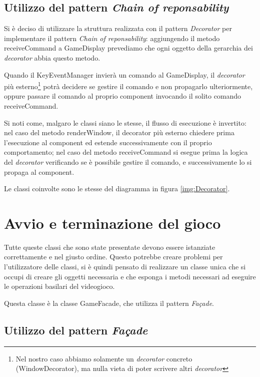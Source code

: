 \documentclass[a4paper,12pt]{article}
\begin{document}
\subsection{Utilizzo del pattern \emph{Chain of reponsability}}

Si \`e deciso di utilizzare la struttura realizzata con il pattern \emph{Decorator} per implementare il pattern \emph{Chain of reponsability}: aggiungendo il metodo \textsf{receiveCommand} a \textsf{GameDisplay} prevediamo che ogni oggetto della gerarchia dei \textit{decorator} abbia questo metodo.

Quando il \textsf{KeyEventManager} invier\`a un comando al \textsf{GameDisplay}, il \textit{decorator} pi\`u esterno\footnote{Nel nostro caso abbiamo solamente un \emph{decorator} concreto (\textsf{WindowDecorator}), ma nulla vieta di poter scrivere altri \textit{decorator}} potr\`a decidere se gestire il comando e non propagarlo ulteriormente, oppure passare il comando al proprio \textsf{component} invocando il solito comando \textsf{receiveCommand}.

Si noti come, malgaro le classi siano le stesse, il flusso di esecuzione \`e invertito: nel caso del metodo \textsf{renderWindow}, il decorator pi\`u esterno chiedere prima l'esecuzione al \textsf{component} ed estende successivamente con il proprio comportamento; nel caso del metodo \textsf{receiveCommand} si esegue prima la logica del \textit{decorator} verificando se \`e possibile gestire il comando, e successivamente lo si propaga al \textsf{component}.

Le classi coinvolte sono le stesse del diagramma in figura \ref{img:Decorator}.

\section{Avvio e terminazione del gioco}
\label{sec:avvio}

Tutte queste classi che sono state presentate devono essere istanziate correttamente e nel giusto ordine. Questo potrebbe creare problemi per l'utilizzatore delle classi, si \`e quindi pensato di realizzare un classe unica che si occupi di creare gli oggetti necessaria e che esponga i metodi necessari ad eseguire le operazioni basilari del videogioco.

Questa classe \`e la classe \textsf{GameFacade}, che utilizza il pattern \emph{Façade}.

\subsection{Utilizzo del pattern \emph{Façade}}
\end{document}
